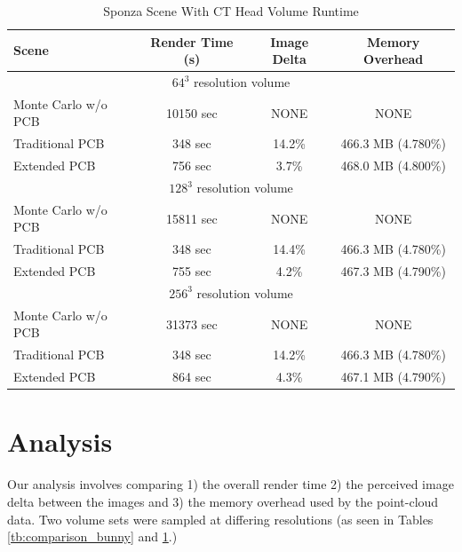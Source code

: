 \documentclass[12pt]{ucthesis}
\begin{document}
\begin{table}
\begin{center}
\begin{tabular}{ | l | c | c | c | }
  \hline                       
  Scene & Render Time (s) & Image Delta & Memory Overhead \\

  \hline
  \multicolumn{4}{|c|}{$64^3$ resolution volume} \\     
  \hline            

  Monte Carlo w/o PCB & 10150 sec & NONE & NONE \\
  Traditional PCB & 348 sec & 14.2\% & 466.3 MB (4.780\%) \\
  Extended PCB & 756 sec & 3.7\% & 468.0 MB (4.800\%)  \\

  \hline
  \multicolumn{4}{|c|}{$128^3$ resolution volume} \\     
  \hline            
             
  Monte Carlo w/o PCB & 15811 sec & NONE & NONE \\
  Traditional PCB & 348 sec & 14.4\% & 466.3 MB (4.780\%) \\
  Extended PCB & 755 sec & 4.2\% & 467.3 MB (4.790\%)  \\

  \hline
  \multicolumn{4}{|c|}{$256^3$ resolution volume} \\     
  \hline            
             
  Monte Carlo w/o PCB & 31373 sec & NONE & NONE \\
  Traditional PCB & 348 sec & 14.2\% & 466.3 MB (4.780\%) \\
  Extended PCB & 864 sec & 4.3\% & 467.1 MB (4.790\%)  \\
  \hline  
\end{tabular}
\caption{Sponza Scene With CT Head Volume Runtime}
\label{tb:comparison_head}
\end{center}
\end{table}


\section{Analysis}
Our analysis involves comparing 1) the overall render time 2) the perceived image delta between the images and 3) the memory overhead used by the point-cloud data.  Two volume sets were sampled at differing resolutions (as seen in Tables \ref{tb:comparison_bunny} and \ref{tb:comparison_head}.)
\end{document}
